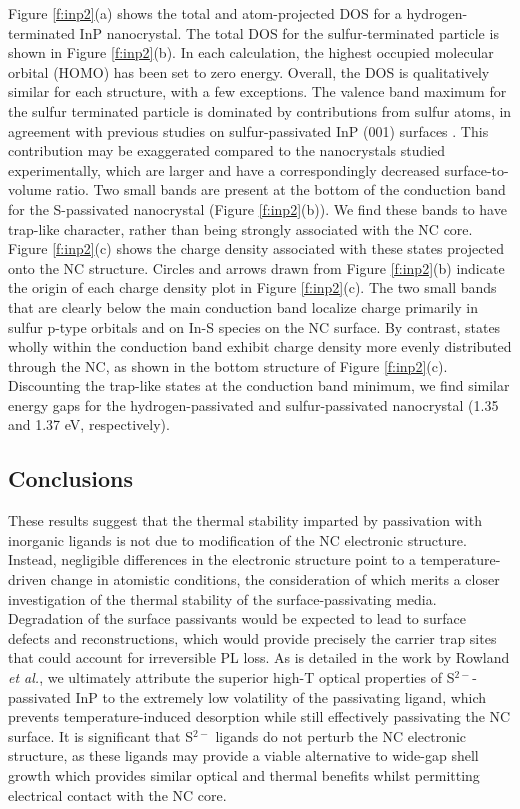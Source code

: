 Figure \ref{f:inp2}(a) shows the total and atom-projected DOS for a hydrogen-terminated InP nanocrystal. The total DOS for the sulfur-terminated particle is shown in Figure \ref{f:inp2}(b). In each calculation, the highest occupied molecular orbital (HOMO) has been set to zero energy. Overall, the DOS is qualitatively similar for each structure, with a few exceptions. The valence band maximum for the sulfur terminated particle is dominated by contributions from sulfur atoms, in agreement with previous studies on sulfur-passivated InP (001) surfaces \cite{deng2010surface}. This contribution may be exaggerated compared to the nanocrystals studied experimentally, which are larger and have a correspondingly decreased surface-to-volume ratio. Two small bands are present at the bottom of the conduction band for the S-passivated nanocrystal (Figure \ref{f:inp2}(b)). We find these bands to have trap-like character, rather than being strongly associated with the NC core. Figure \ref{f:inp2}(c) shows the charge density associated with these states projected onto the NC structure. Circles and arrows drawn from Figure \ref{f:inp2}(b) indicate the origin of each charge density plot in Figure \ref{f:inp2}(c). The two small bands that are clearly below the main conduction band localize charge primarily in sulfur p-type orbitals and on In-S species on the NC surface. By contrast, states wholly within the conduction band exhibit charge density more evenly distributed through the NC, as shown in the bottom structure of Figure \ref{f:inp2}(c). Discounting the trap-like states at the conduction band minimum, we find similar energy gaps for the hydrogen-passivated and sulfur-passivated nanocrystal (1.35 and 1.37 eV, respectively). \par

\subsection{Conclusions}
These results suggest that the thermal stability imparted by passivation with inorganic ligands is not due to modification of the NC electronic structure. Instead, negligible differences in the electronic structure point to a temperature-driven change in atomistic conditions, the consideration of which merits a closer investigation of the thermal stability of the surface-passivating media. Degradation of the surface passivants would be expected to lead to surface defects and reconstructions, which would provide precisely the carrier trap sites that could account for irreversible PL loss. As is detailed in the work by Rowland \emph{et al.}, we ultimately attribute the superior high-T optical properties of S$^{2-}$-passivated InP to the extremely low volatility of the passivating ligand, which prevents temperature-induced desorption while still effectively passivating the NC surface. It is significant that S$^{2-}$ ligands do not perturb the NC electronic structure, as these ligands may provide a viable alternative to wide-gap shell growth which provides similar optical and thermal benefits whilst permitting electrical contact with the NC core. 

